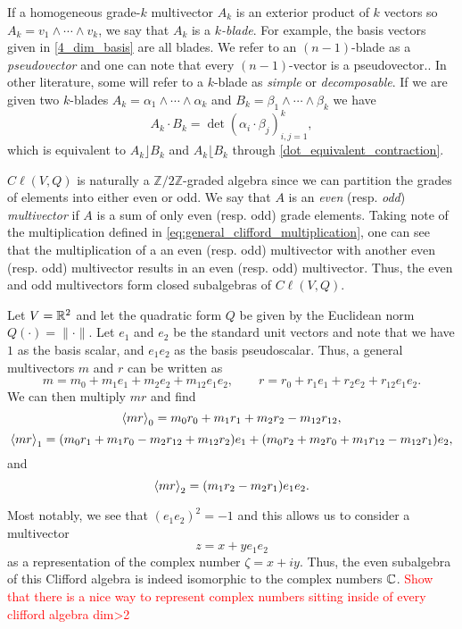 \documentclass[12pt]{article}
\begin{document}
If a homogeneous grade-$k$ multivector $A_k$ is an exterior product of $k$ vectors so $A_k = v_1 \wedge \cdots \wedge v_k$, we say that $A_k$ is a \emph{$k$-blade}. For example, the basis vectors given in \ref{4_dim_basis} are all blades. We refer to an $(n-1)$-blade as a \emph{pseudovector} and one can note that every $(n-1)$-vector is a pseudovector.. In other literature, some will refer to a $k$-blade as \emph{simple} or \emph{decomposable}. If we are given two $k$-blades $A_k = \alpha_1 \wedge \cdots \wedge \alpha_k$ and $B_k = \beta_1 \wedge \cdots \wedge \beta_k$ we have 
\begin{equation}
\label{eq:dot_product}
A_k \cdot B_k = \det(\alpha_i \cdot \beta_j )_{i,j=1}^k,
\end{equation}
which is equivalent to $A_k \rfloor B_k$ and $A_k \lfloor B_k$ through \ref{dot_equivalent_contraction}. 

$C\ell(V,Q)$ is naturally a $\mathbb{Z}/2\mathbb{Z}$-graded algebra since we can partition the grades of elements into either even or odd.  We say that $A$ is an \emph{even} (resp. \emph{odd}) \emph{multivector} if $A$ is a sum of only even (resp. odd) grade elements.  Taking note of the multiplication defined in \ref{eq:general_clifford_multiplication}, one can see that the multiplication of a an even (resp. odd) multivector with another even (resp. odd) multivector results in an even (resp. odd) multivector.  Thus, the even and odd multivectors form closed subalgebras of $C\ell(V,Q)$.

\begin{example}
Let $V=\R^2$ and let the quadratic form $Q$ be given by the Euclidean norm $Q(\cdot)=\|\cdot\|$.  Let $e_1$ and $e_2$ be the standard unit vectors and note that we have $1$ as the basis scalar, and $e_1e_2$ as the basis pseudoscalar.  Thus, a general multivectors $m$ and $r$ can be written as
\[
m = m_0 + m_1 e_1 + m_2 e_2 + m_{12} e_1 e_2, \qquad r = r_0 +r_1 e_1 + r_2 e_2 + r_{12}e_1 e_2.
\]
We can then multiply $mr$ and find
\[
\proj{0}{mr} = m_0r_0 + m_1 r_1 + m_2 r_2 - m_{12}r_{12},
\]
\[
\proj{1}{mr} = (m_0 r_1 + m_1 r_0 - m_2 r_{12} + m_{12} r_2) e_1 + (m_0 r_2 + m_2 r_0 + m_1r_{12} - m_{12} r_1) e_2,
\]
and
\[
\proj{2}{mr} = (m_1r_2 - m_2 r_1)e_1e_2.
\]

Most notably, we see that $(e_1e_2)^2=-1$ and this allows us to consider a multivector 
\[
z = x + y e_1 e_2 
\]
as a representation of the complex number $\zeta = x+ iy$.  Thus, the even subalgebra of this Clifford algebra is indeed isomorphic to the complex numbers $\C$. \textcolor{red}{Show that there is a nice way to represent complex numbers sitting inside of every clifford algebra dim>2}
\end{example}
\end{document}
